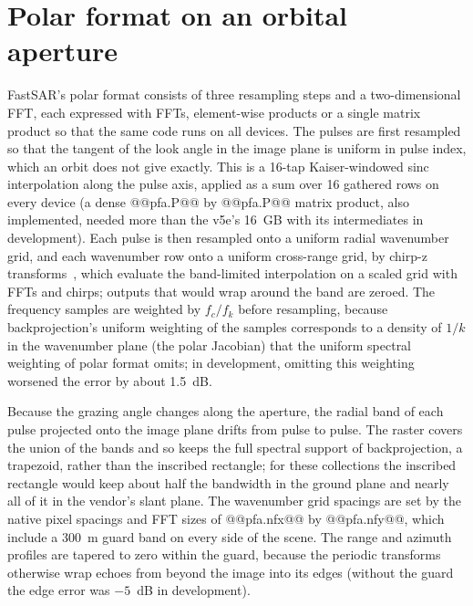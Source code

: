 \documentclass[11pt]{article}
\begin{document}

\section{Polar format on an orbital aperture}
\label{app:pfa}

FastSAR's polar format consists of three resampling steps and a two-dimensional FFT, each expressed with FFTs, element-wise products or a single matrix product so that the same code runs on all devices. The pulses are first resampled so that the tangent of the look angle in the image plane is uniform in pulse index, which an orbit does not give exactly. This is a 16-tap Kaiser-windowed sinc interpolation along the pulse axis, applied as a sum over 16 gathered rows on every device (a dense @@pfa.P@@ by @@pfa.P@@ matrix product, also implemented, needed more than the v5e's 16~GB with its intermediates in development). Each pulse is then resampled onto a uniform radial wavenumber grid, and each wavenumber row onto a uniform cross-range grid, by chirp-z transforms~\cite{rabiner1969}, which evaluate the band-limited interpolation on a scaled grid with FFTs and chirps; outputs that would wrap around the band are zeroed. The frequency samples are weighted by $f_c / f_k$ before resampling, because backprojection's uniform weighting of the samples corresponds to a density of $1/k$ in the wavenumber plane (the polar Jacobian) that the uniform spectral weighting of polar format omits; in development, omitting this weighting worsened the error by about 1.5~dB.

Because the grazing angle changes along the aperture, the radial band of each pulse projected onto the image plane drifts from pulse to pulse. The raster covers the union of the bands and so keeps the full spectral support of backprojection, a trapezoid, rather than the inscribed rectangle; for these collections the inscribed rectangle would keep about half the bandwidth in the ground plane and nearly all of it in the vendor's slant plane. The wavenumber grid spacings are set by the native pixel spacings and FFT sizes of @@pfa.nfx@@ by @@pfa.nfy@@, which include a 300~m guard band on every side of the scene. The range and azimuth profiles are tapered to zero within the guard, because the periodic transforms otherwise wrap echoes from beyond the image into its edges (without the guard the edge error was $-5$~dB in development).
\end{document}
